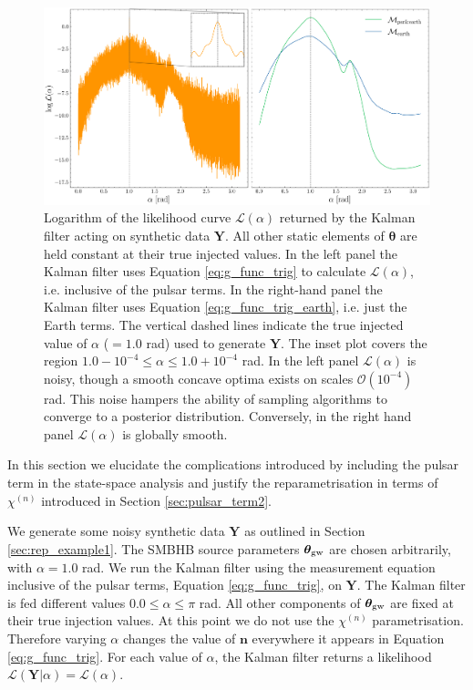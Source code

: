 \documentclass[fleqn,usenatbib,useAMS]{mnras}
\begin{document}
\begin{figure}
	\includegraphics[width=\textwidth, height =0.5\textwidth ]{images/Likelihoods_alpha}
	\caption{Logarithm of the likelihood curve $\mathcal{L}(\alpha)$ returned by the Kalman filter acting on synthetic data $\boldsymbol{Y}$. All other static elements of $\boldsymbol{\theta}$ are held constant at their true injected values. In the left panel the Kalman filter uses Equation \eqref{eq:g_func_trig} to calculate $\mathcal{L}(\alpha)$, i.e. inclusive of the pulsar terms. In the right-hand panel the Kalman filter uses Equation \eqref{eq:g_func_trig_earth}, i.e. just the Earth terms. The vertical dashed lines indicate the true injected value of $\alpha$ ($=1.0$ rad) used to generate $\boldsymbol{Y}$. The inset plot covers the region $1.0 - 10^{-4} \le \alpha \le 1.0 +10^{-4}$ rad. In the left panel $\mathcal{L}(\alpha)$ is noisy, though a smooth concave optima exists on scales $\mathcal{O}(10^{-4})$ rad. This noise hampers the ability of sampling algorithms to converge to a posterior distribution. Conversely, in the right hand panel $\mathcal{L}(\alpha)$ is globally smooth. }
	\label{fig:likelihood_comparison}
\end{figure}
In this section we elucidate the complications introduced by including the pulsar term in the state-space analysis and justify the reparametrisation in terms of $\chi^{(n)}$ introduced in Section \ref{sec:pulsar_term2}. \newline 


We generate some noisy synthetic data $\boldsymbol{Y}$ as outlined in Section \ref{sec:rep_example1}. The SMBHB source parameters $\boldsymbol{\theta}_{\rm gw}$ are chosen arbitrarily, with $\alpha = 1.0 $ rad. We run the Kalman filter using the measurement equation inclusive of the pulsar terms, Equation \eqref{eq:g_func_trig}, on $\boldsymbol{Y}$. The Kalman filter is fed different values $ 0.0 \le \alpha \le \pi$ rad. All other components of $\boldsymbol{\theta}_{\rm gw}$ are fixed at their true injection values. At this point we do not use the $\chi^{(n)}$ parametrisation. Therefore varying $\alpha$ changes the value of $\boldsymbol{n}$ everywhere it appears in Equation \eqref{eq:g_func_trig}. For each value of $\alpha$, the Kalman filter returns a likelihood $\mathcal{L}(\boldsymbol{Y} | \alpha) = \mathcal{L}(\alpha)$. \newline 
\end{document}
